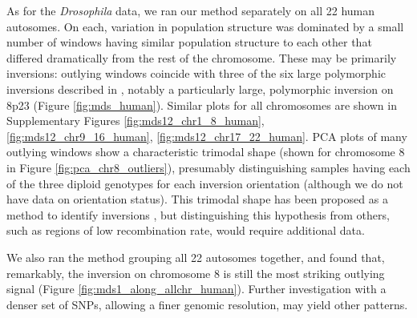 \documentclass[11pt, oneside]{article}   	%
\begin{document}
As for the \textit{Drosophila} data, we ran our method separately on all 22 human autosomes.
On each, variation in population structure was dominated by a small number of windows
having similar population structure to each other that differed dramatically from the rest of the chromosome.
These may be primarily inversions: outlying windows coincide with
three of the six large polymorphic inversions described in \citet{antonacci2009characterization},
notably a particularly large, polymorphic inversion on 8p23 (Figure \ref{fig:mds_human}). 
Similar plots for all chromosomes are shown
in Supplementary Figures \ref{fig:mds12_chr1_8_human}, \ref{fig:mds12_chr9_16_human}, \ref{fig:mds12_chr17_22_human}.
PCA plots of many outlying windows show a characteristic trimodal shape 
(shown for chromosome 8 in Figure \ref{fig:pca_chr8_outliers}),
presumably distinguishing samples having each of the three diploid genotypes for each inversion orientation
(although we do not have data on orientation status).
This trimodal shape has been proposed as a method to identify inversions \citep{ma2012investigation},
but distinguishing this hypothesis from others,
such as regions of low recombination rate,
would require additional data.

We also ran the method grouping all 22 autosomes together, 
and found that, remarkably, 
the inversion on chromosome 8 is still the most striking outlying signal (Figure \ref{fig:mds1_along_allchr_human}). 
Further investigation with a denser set of SNPs,
allowing a finer genomic resolution,
may yield other patterns.
\end{document}
